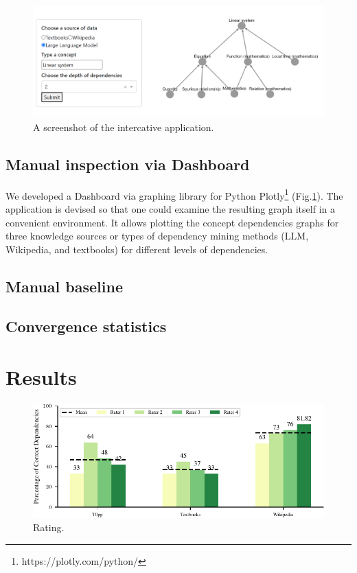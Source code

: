 \documentclass{article}
\begin{document}
\begin{figure}
    \centering
    \includegraphics[width=.95\textwidth]{img/dash_example.png}
    \caption{A screenshot of the intercative application.}
    \label{fig:dash_example}
\end{figure}

\subsection{Manual inspection via Dashboard}
We developed a Dashboard via graphing library for Python Plotly\footnote{https://plotly.com/python/} (Fig.\ref{fig:dash_example}). The application is devised so that one could examine the resulting graph itself in a convenient environment. It allows plotting the concept dependencies graphs for three knowledge sources or types of dependency mining methods (LLM, Wikipedia, and textbooks) for different levels of dependencies.   



\subsection{Manual baseline}

\subsection{Convergence statistics}

\section{Results}



\begin{figure}[H]
    \centering
    \includegraphics[width=.95\textwidth]{img/rating.pdf}
    \caption{Rating.}
    \label{fig:rating}
\end{figure}
\end{document}
